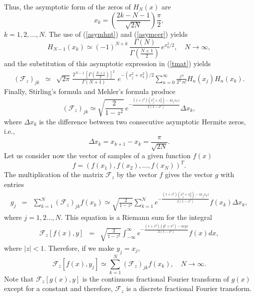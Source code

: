 \documentclass[12pt]{article}
\begin{document}
Thus, the asymptotic form of the zeros of $H_N(x)$ are
\begin{equation}\label{asymcer}
x_k= \left(\frac{2 k-N-1}{\sqrt{2N}}\right)\frac{\pi}{2},
\end{equation}
$k=1,2,\ldots,N$. The use of (\ref{asymhnt}) and (\ref{asymcer}) yields
\[
H_{N-1}(x_k)\simeq (-1)^{N+k}\,\frac{\Gamma(N)}{\Gamma(\frac{N+1}{2})}\,e^{x_k^2/2},\quad N\to\infty,
\]
and the substitution of this asymptotic expression in (\ref{tmat}) yields
\begin{eqnarray*}
({\mathcal F}_z)_{jk}&\simeq&\sqrt{2\pi}\,\frac{2^{N-1}\,[\Gamma(\frac{N+1}{2})]^2}{\Gamma(N+1)}\,\,e^{-(x_j^2+x_k^2)/2}\sum_{n=0}^{\infty}\frac{z^n}{2^n\,n!}H_n(x_j)H_n(x_k).
\end{eqnarray*}
Finally, Stirling's formula and Mehler's formula \cite{Erd53} produce 
\begin{equation}\label{fasy}
({\mathcal F}_z)_{jk}\simeq \sqrt{\frac{2}{1-z^2}}\,e^{-\frac{(1+z^2)(x_j^2+x_k^2)-4x_jx_kz}{2(1-z^2)}}\Delta x_k,
\end{equation}
where $\Delta x_k$ is the difference between two consecutive asymptotic Hermite zeros, i.e.,
\begin{equation}\label{deltk}
\Delta x_k=x_{k+1}-x_k=\frac{\pi}{\sqrt{2N}}.
\end{equation}
Let us consider now the vector of samples of a given function $f(x)$
\[
f=(f(x_1),f(x_2),\ldots,f(x_N))^T.
\] 
The multiplication of the matrix ${\mathcal F}_z$ by the vector $f$ gives the vector $g$ with entries
\begin{eqnarray}\label{primcuad}
g_j&=&\sum_{k=1}^N({\mathcal F}_z)_{jk}f(x_k)\simeq \sqrt{\frac{2}{1-z^2}}\sum_{k=1}^N e^{-\frac{(1+z^2)(x_j^2+x_k^2)-4x_jx_kz}{2(1-z^2)}}f(x_k)\Delta x_k,\nonumber
\end{eqnarray}
where $j=1,2\ldots,N.$ This equation is a Riemann sum for the integral
\begin{eqnarray}\label{eqifft}
{\mathscr F}_z[f(x),y]&=&\sqrt{\frac{2}{1-z^2}}\int_{-\infty}^\infty e^{-\frac{(1+z^2)(y^2+x^2)-4xyz}{2(1-z^2)}}f(x)dx,\nonumber 
\end{eqnarray}
where $\vert z\vert<1$. Therefore, if we make $y_j=x_j$,
\begin{equation}\label{cuadtrfor}
{\mathscr F}_z[f(x),y_j]\simeq\sum_{k=1}^N({\mathcal F}_z)_{jk}f(x_k),\quad N\to\infty.
\end{equation}
Note that ${\mathscr F}_z[g(x),y]$ is the continuous fractional Fourier transform \cite{Nam80} of $g(x)$ except for a constant and therefore, ${\mathcal F}_z$ is a discrete fractional Fourier transform.  
\end{document}

